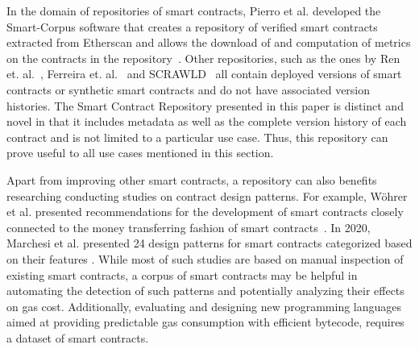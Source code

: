 \documentclass[10pt,conference]{IEEEtran}
\begin{document}
	In the domain of repositories of smart contracts, Pierro et al. developed the Smart-Corpus software that creates a repository of verified smart contracts extracted from Etherscan and allows the download of and computation of metrics on the contracts in the repository~\cite{smartcorpus}. Other repositories, such as the ones by Ren et. al.~\cite{renrepo}, Ferreira et. al.~\cite{ferreirarepo} and SCRAWLD~\cite{scrawld} all contain deployed versions of smart contracts or synthetic smart contracts and do not have associated version histories. The Smart Contract Repository presented in this paper is distinct and novel in that it includes metadata as well as the complete version history of each contract and is not limited to a particular use case. Thus, this repository can prove useful to all use cases mentioned in this section. 
	
	Apart from improving other smart contracts, a repository can also benefits researching conducting studies on contract design patterns. For example, Wöhrer et al. presented recommendations for the development of smart contracts closely connected to the money transferring fashion of smart contracts~\cite{wohrer}. In 2020, Marchesi et al. presented 24 design patterns for smart contracts categorized based on their features \cite{marchesi}. While most of such studies are based on manual inspection of existing smart contracts, a corpus of smart contracts may be helpful in automating the detection of such patterns and potentially analyzing their effects on gas cost. Additionally, evaluating and designing new programming languages aimed at providing predictable gas consumption with efficient bytecode, requires a dataset of smart contracts.
	
\end{document}
